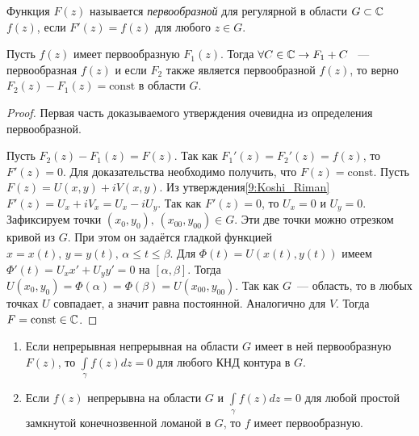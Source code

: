 
\begin{definition}
    Функция \(F(z)\) называется \textit{первообразной} для регулярной в области \(G \subset \mathbb{C}\) 
    \(f(z)\), если \(F'(z) = f(z)\) для любого \(z \in G\).
\end{definition}

\begin{statement}
    Пусть \(f(z)\) имеет первообразную \(F_1(z)\). Тогда \(\forall C \in \mathbb{C} \rightarrow F_1 + C\)
    ~--- первообразная \(f(z)\) и если \(F_2\) также является первообразной \(f(z)\), то верно
    \(F_2(z) - F_1(z) = \text{const}\) в области \(G\).
\end{statement}

\begin{proof}
    Первая часть доказываемого утверждения очевидна из определения первообразной.

    Пусть \(F_2(z) - F_1(z) = F(z)\). Так как \(F_1'(z)=F_2'(z) = f(z)\), то \(F'(z) = 0\). 
    Для доказательства необходимо получить, что \(F(z) = \text{const}\). Пусть \(F(z) = 
    U(x, y) + iV(x, y)\). Из утверждения\ref{9:Koshi_Riman} \(F'(z) = U_x + iV_x = U_x - iU_y\). Так
    как \(F'(z) = 0\), то \(U_x = 0\) и \(U_y = 0\). Зафиксируем точки \((x_0, y_0), \, (x_{00}, 
    y_{00}) \in G\). Эти две точки можно отрезком кривой из \(G\). При этом он задаётся гладкой 
    функцией \(x = x(t), \, y = y(t), \, \alpha \le t \le \beta\). Для \(\Phi(t) = U(x(t), y(t))\) 
    имеем \(\Phi'(t) = U_x x' + U_y y' = 0\) на \([\alpha, \beta]\). Тогда \(U(x_0, y_0) = 
    \Phi(\alpha) = \Phi(\beta) = U(x_{00}, y_{00})\). Так как \(G\)~--- область, то в любых точках 
    \(U\) совпадает, а значит равна постоянной. Аналогично для \(V\). Тогда \(F = \text{const} \in 
    \mathbb{C}\).
\end{proof}

\begin{statement} \label{12:int_kontur}
    \begin{enumerate}[wide=20pt, label=\arabic*., itemsep=0ex]
        \item Если непрерывная непрерывная на области \(G\) имеет в ней первообразную \(F(z)\), то
        \(\int\limits_\gamma f(z) dz = 0\) для любого КНД контура в \(G\).
        \item Если \(f(z)\) непрерывна на области \(G\) и \(\int\limits_\gamma f(z) dz = 0\) для
        любой простой замкнутой конечнозвенной ломаной в \(G\), то \(f\) имеет первообразную.
    \end{enumerate}
\end{statement}

